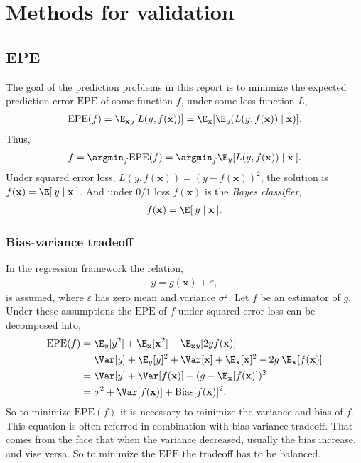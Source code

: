 \chapter{Methods for validation}
\label{chap:Metods for validation}
\section{EPE}
\label{sec:EPE}
The goal of the prediction problems in this report is to minimize the expected prediction error $\mathrm{EPE}$ of some function $f$, under some loss function $L$,
\begin{align}
  \mathrm{EPE}(f) = \E_{\mathbf{x} y}[L(y, f(\mathbf{x}))] = \E_{\mathbf{x}} [\E_y (L(y, f(\mathbf{x})) \mid \mathbf{x})].
\end{align}
Thus,
\begin{align}
  f = \argmin_{f} \mathrm{EPE}(f) = \argmin_{ f} \E_y [L(y, f(\mathbf{x})) \mid \mathbf{x}\: ].
\end{align}
Under squared error loss, $L(y, f(\mathbf{x})) = (y- f(\mathbf{x}))^2$, the solution is 
$ f(\mathbf{x}) = \E[\:y \mid \mathbf{x}\:]$. And under $0/1$ loss $ f(\mathbf{x})$ is the \textit{Bayes classifier},
\begin{align}
  f(\mathbf{x}) = \E[\: y \mid \mathbf{x} \:].
\end{align}

\subsection{Bias-variance tradeoff}
\label{sub:Bias-variance tradeoff}
In the regression framework the relation,
\begin{align}
  y = g(\mathbf{x}) + \varepsilon,  
\end{align}
is assumed, where $\varepsilon$ has zero mean and variance $\sigma^2$. Let $f$ be an estimator of $g$.
Under these assumptions the $\mathrm{EPE}$ of $f$ under squared error loss can be decomposed into,
\begin{align}
  \mathrm{EPE}(f) &=  \E_y[y^2] + \E_\mathbf{x}[\mathbf{x}^2] - \E_{\mathbf{x} y}[2 y f(\mathbf{x})] \notag \\
                       &= \Var[y] + \E_y[y]^2 + \Var[\mathbf{x}] + \E_\mathbf{x}[\mathbf{x}]^2 - 2 g\: \E_\mathbf{x}[f(\mathbf{x})] \notag \\
                       &= \Var[y] + \Var[ f(\mathbf{x})] + (g - \E_\mathbf{x}[ f(\mathbf{x})])^2 \notag \\
                       &= \sigma^2 + \Var[ f(\mathbf{x})] + \mathrm{Bias}[f(\mathbf{x})]^2.
\end{align}
So to minimize $\mathrm{EPE}(f)$ it is necessary to minimize the variance and bias of $f$. This equation is often referred in combination with bias-variance tradeoff. That comes from the face that when the variance decreased, usually the bias increase, and vise versa. So to minimize the $\mathrm{EPE}$ the tradeoff has to be balanced. 

